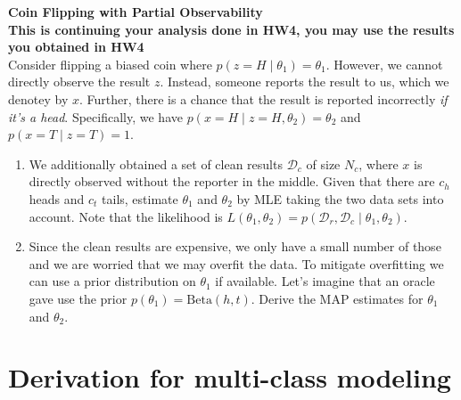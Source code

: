 \documentclass{article}
\newcommand{\nyuparagraph}[1]{\vspace{0.3cm}\textcolor{nyupurple}{\bf \large #1}\\}
\theoremstyle{plain}
\theoremstyle{definition}
\begin{document}
\nyuparagraph{Coin Flipping with Partial Observability}
\textbf{This is continuing your analysis done in HW4, you may use the results you obtained in HW4}\\
Consider flipping a biased coin where $p(z=H\mid \theta_1) = \theta_1$.
However, we cannot directly observe the result $z$.
Instead, someone reports the result to us,
which we denotey by $x$.
Further, there is a chance that the result is reported incorrectly \emph{if it's a head}.
Specifically, we have $p(x=H\mid z=H, \theta_2) = \theta_2$
and $p(x=T\mid z=T) = 1$.
\begin{enumerate}
  \setcounter{enumi}{\value{saveenum}}
\item We additionally obtained a set of clean results $\mathcal{D}_c$ of size $N_c$, where $x$ is directly observed without the reporter in the middle. Given that there are $c_h$ heads and $c_t$ tails,
estimate $\theta_1$ and $\theta_2$ by MLE taking the two data sets into account.
Note that the likelihood is $L(\theta_1, \theta_2) = p(\mathcal{D}_r, \mathcal{D}_c\mid \theta_1, \theta_2)$.

\item Since the clean results are expensive, we only have a small number of those and we are worried that we may overfit the data.
To mitigate overfitting we can use a prior distribution on $\theta_1$ if available. Let's imagine that an oracle gave use the prior $p(\theta_1) = \text{Beta}(h, t)$.
Derive the MAP estimates for $\theta_1$ and $\theta_2$.
\setcounter{saveenum}{\value{enumi}}
\end{enumerate}
\section{Derivation for multi-class modeling}
\end{document}
